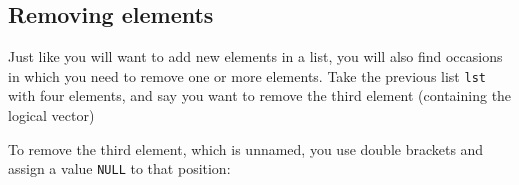 \documentclass[
]{book}
\newenvironment{Shaded}{\begin{snugshade}}{\end{snugshade}}
\newcommand{\CommentTok}[1]{\textcolor[rgb]{0.56,0.35,0.01}{\textit{#1}}}
\newcommand{\ConstantTok}[1]{\textcolor[rgb]{0.00,0.00,0.00}{#1}}
\newcommand{\DecValTok}[1]{\textcolor[rgb]{0.00,0.00,0.81}{#1}}
\newcommand{\NormalTok}[1]{#1}
\newcommand{\OtherTok}[1]{\textcolor[rgb]{0.56,0.35,0.01}{#1}}
\newcommand{\SpecialCharTok}[1]{\textcolor[rgb]{0.00,0.00,0.00}{#1}}
\newcommand{\StringTok}[1]{\textcolor[rgb]{0.31,0.60,0.02}{#1}}
\begin{document}
\begin{Shaded}
\end{Shaded}

\hypertarget{removing-elements}{%
\subsection{Removing elements}\label{removing-elements}}

Just like you will want to add new elements in a list, you will also find
occasions in which you need to remove one or more elements. Take the previous
list \texttt{lst} with four elements, and say you want to remove the third element
(containing the logical vector)

\begin{Shaded}
\end{Shaded}

To remove the third element, which is unnamed, you use double brackets and
assign a value \texttt{NULL} to that position:

\begin{Shaded}
\end{Shaded}
\end{document}
